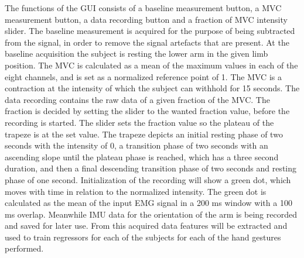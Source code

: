The functions of the GUI consists of a baseline measurement button, a MVC measurement button, a data recording button and a fraction of MVC intensity slider. The baseline measurement is acquired for the purpose of being subtracted from the signal, in order to remove the signal artefacts that are present. At the baseline acquisition the subject is resting the lower arm in the given limb position. The MVC is calculated as a mean of the maximum values in each of the eight channels, and is set as a normalized reference point of 1. The MVC is a contraction at the intensity of which the subject can withhold for 15 seconds. The data recording contains the raw data of a given fraction of the MVC. The fraction is decided by setting the slider to the wanted fraction value, before the recording is started. The slider sets the fraction value so the plateau of the trapeze is at the set value. The trapeze depicts an initial resting phase of two seconds with the intensity of 0, a transition phase of two seconds with an ascending slope until the plateau phase is reached, which has a three second duration, and then a final descending transition phase of two seconds and resting phase of one second. Initialization of the recording will show a green dot, which moves with time in relation to the normalized intensity. The green dot is calculated as the mean of the input EMG signal in a 200 ms window with a 100 ms overlap. Meanwhile IMU data for the orientation of the arm is being recorded and saved for later use. %
From this acquired data features will be extracted and used to train regressors for each of the subjects for each of the hand gestures performed.


